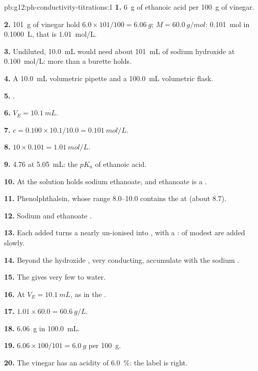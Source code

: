 \begin{solution}{pb:g12:ph-conductivity-titrations:1}
\textbf{1.} \qty{6}{g} of ethanoic acid per \qty{100}{g} of vinegar.

\textbf{2.} \qty{101}{g} of vinegar hold $6.0 \times 101/100 =
\qty{6.06}{g}$; $M = \qty{60.0}{g/mol}$: \qty{0.101}{mol} in
\qty{0.1000}{L}, that is \qty{1.01}{mol/L}.

\textbf{3.} Undiluted, \qty{10.0}{mL} would need about \qty{101}{mL} of
sodium hydroxide at \qty{0.100}{mol/L}: more than a burette holds.

\textbf{4.} A \qty{10.0}{mL} volumetric pipette and a \qty{100.0}{mL}
volumetric flask.

\textbf{5.} .

\textbf{6.} $V_E = \qty{10.1}{mL}$.

\textbf{7.} $c = 0.100 \times 10.1 / 10.0 = \qty{0.101}{mol/L}$.

\textbf{8.} $10 \times 0.101 = \qty{1.01}{mol/L}$.

\textbf{9.}  4.76 at \qty{5.05}{mL}: the $pK_a$ of ethanoic acid.

\textbf{10.} At  the solution holds sodium ethanoate, and
ethanoate is a .

\textbf{11.} Phenolphthalein, whose range 8.0--10.0 contains the  at
 (about 8.7).

\textbf{12.} Sodium  and ethanoate .

\textbf{13.} Each  added turns a nearly un-ionised  into
, with a :  of modest  are added
slowly.

\textbf{14.} Beyond  the hydroxide , very conducting,
accumulate with the sodium .

\textbf{15.} The  gives very few  to water.

\textbf{16.} At $V_E = \qty{10.1}{mL}$, as in the .

\textbf{17.} $1.01 \times 60.0 = \qty{60.6}{g/L}$.

\textbf{18.} \qty{6.06}{g} in \qty{100.0}{mL}.

\textbf{19.} $6.06 \times 100 / 101 = \qty{6.0}{g}$ per \qty{100}{g}.

\textbf{20.} The vinegar has an acidity of \qty{6.0}{\percent}: the label is
right.
\end{solution}
